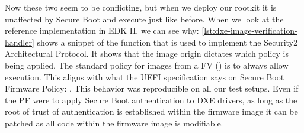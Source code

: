 Now these two seem to be conflicting, but when we deploy our rootkit it is unaffected by Secure Boot and execute just like before.
When we look at the reference implementation in \ac{EDK} II, we can see why: \autoref{lst:dxe-image-verification-handler} shows a snippet of the function that is used to implement the Security2 Architectural Protocol.
It shows that the image origin dictates which policy is being applied.
The standard policy for images from a \acf{FV} () is to always allow execution.
This aligns with what the \ac{UEFI} specification says on Secure Boot Firmware Policy:
.
This behavior was reproducible on all our test setups.
Even if the \ac{PF} were to apply Secure Boot authentication to \ac{DXE} drivers, as long as the root of trust of authentication is established within the firmware image it can be patched as all code within the firmware image is modifiable.



\clearpage